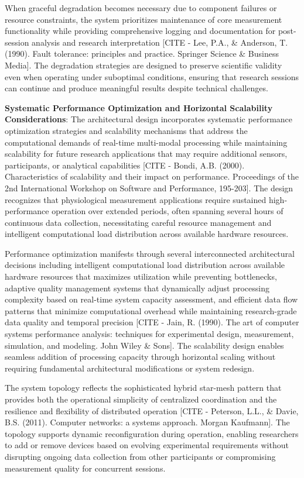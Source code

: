 \documentclass[12pt,a4paper]{article}
\begin{document}
When graceful degradation becomes necessary due to component failures or resource constraints, the system prioritizes
maintenance of core measurement functionality while providing comprehensive logging and documentation for post-session
analysis and research
interpretation [CITE - Lee, P.A., \& Anderson, T. (1990). Fault tolerance: principles and practice. Springer Science \& Business Media].
The degradation strategies are designed to preserve scientific validity even when operating under suboptimal conditions,
ensuring that research sessions can continue and produce meaningful results despite technical challenges.

\textbf{Systematic Performance Optimization and Horizontal Scalability Considerations}: The architectural design incorporates
systematic performance optimization strategies and scalability mechanisms that address the computational demands of
real-time multi-modal processing while maintaining scalability for future research applications that may require
additional sensors, participants, or analytical
capabilities [CITE - Bondi, A.B. (2000). Characteristics of scalability and their impact on performance. Proceedings of the 2nd International Workshop on Software and Performance, 195-203].
The design recognizes that physiological measurement applications require sustained high-performance operation over
extended periods, often spanning several hours of continuous data collection, necessitating careful resource management
and intelligent computational load distribution across available hardware resources.

Performance optimization manifests through several interconnected architectural decisions including intelligent
computational load distribution across available hardware resources that maximizes utilization while preventing
bottlenecks, adaptive quality management systems that dynamically adjust processing complexity based on real-time system
capacity assessment, and efficient data flow patterns that minimize computational overhead while maintaining
research-grade data quality and temporal
precision [CITE - Jain, R. (1990). The art of computer systems performance analysis: techniques for experimental design, measurement, simulation, and modeling. John Wiley \& Sons].
The scalability design enables seamless addition of processing capacity through horizontal scaling without requiring
fundamental architectural modifications or system redesign.

The system topology reflects the sophisticated hybrid star-mesh pattern that provides both the operational simplicity of
centralized coordination and the resilience and flexibility of distributed
operation [CITE - Peterson, L.L., \& Davie, B.S. (2011). Computer networks: a systems approach. Morgan Kaufmann]. The
topology supports dynamic reconfiguration during operation, enabling researchers to add or remove devices based on
evolving experimental requirements without disrupting ongoing data collection from other participants or compromising
measurement quality for concurrent sessions.
\end{document}

